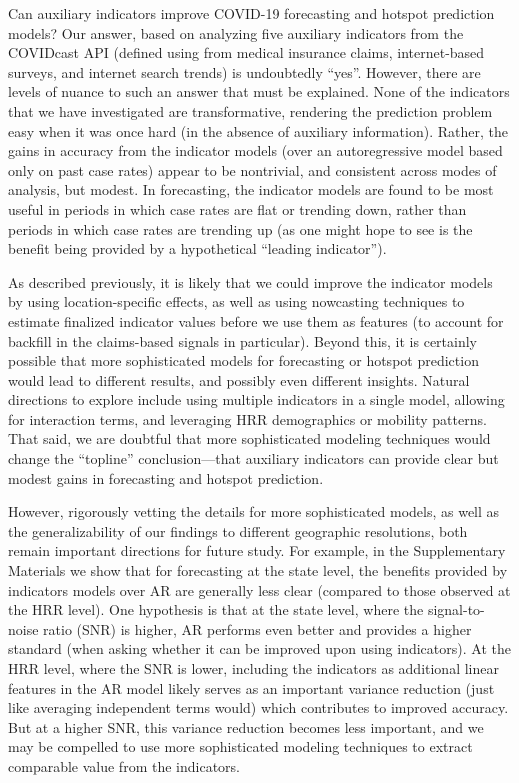\documentclass[9pt,twocolumn,twoside,lineno]{pnas-new}
\begin{document}
Can auxiliary indicators improve COVID-19 forecasting and hotspot prediction
models?  Our answer, based on analyzing five auxiliary indicators from the
COVIDcast API (defined using from medical insurance claims, internet-based
surveys, and internet search trends) is undoubtedly ``yes''. However, there are
levels of nuance to such an answer that must be explained.  None of the
indicators that we have investigated are transformative, rendering the
prediction problem easy when it was once hard (in the absence of auxiliary
information). Rather, the gains in accuracy from the indicator models (over an 
autoregressive model based only on past case rates) appear to be nontrivial, and
consistent across modes of analysis, but modest.  In forecasting, the indicator
models are found to be most useful in periods in which case rates are flat or
trending down, rather than periods in which case rates are trending up (as one
might hope to see is the benefit being provided by a hypothetical ``leading 
indicator'').

As described previously, it is likely that we could improve the indicator models
by using location-specific effects, as well as using nowcasting techniques to
estimate finalized indicator values before we use them as features (to account
for backfill in the claims-based signals in particular).  Beyond this, it is
certainly possible that more sophisticated models for forecasting or hotspot
prediction would lead to different results, and possibly even different
insights. Natural directions to explore include using multiple indicators in a
single model, allowing for interaction terms, and leveraging HRR demographics or
mobility patterns.  That said, we are doubtful that more sophisticated modeling
techniques would change the ``topline'' conclusion---that auxiliary indicators
can provide clear but modest gains in forecasting and hotspot prediction.   

However, rigorously vetting the details for more sophisticated models, as well
as the generalizability of our findings to different geographic resolutions,
both remain important directions for future study.  For example, in the
Supplementary Materials we show that for forecasting at the state level, the
benefits provided by indicators models over AR are generally less clear
(compared to those observed at the HRR level).  One hypothesis is that at the
state level, where the signal-to-noise ratio (SNR) is higher, AR performs even
better and provides a higher standard (when asking whether it can be improved
upon using indicators).  At the HRR level, where the SNR is lower, including the
indicators as additional linear features in the AR model likely serves as an
important variance reduction (just like averaging independent terms would) which
contributes to improved accuracy.  But at a higher SNR, this variance
reduction becomes less important, and we may be compelled to use more
sophisticated modeling techniques to extract comparable value from the
indicators. 
\end{document}
